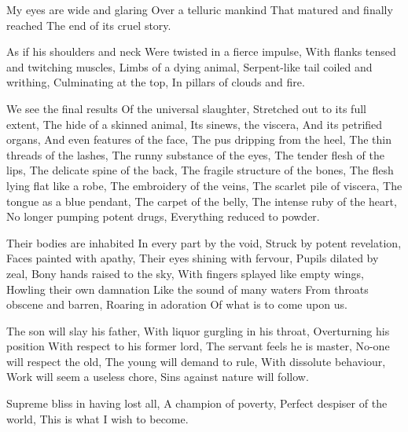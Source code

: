 \documentclass{article}
\newenvironment{stanza}{\begin{minipage}{10cm}\begin{internallinenumbers}\obeylines}{\end{internallinenumbers}\end{minipage}\vspace{\baselineskip}}
\begin{document}
\begin{stanza}
My eyes are wide and glaring
Over a telluric mankind
That matured and finally reached
The end of its cruel story.
\end{stanza}

\begin{stanza}
As if his shoulders and neck
Were twisted in a fierce impulse,
With flanks tensed and twitching muscles,
Limbs of a dying animal,
Serpent-like tail coiled and writhing,
Culminating at the top,
In pillars of clouds and fire.
\end{stanza}

\begin{stanza}
We see the final results
Of the universal slaughter,
Stretched out to its full extent,
The hide of a skinned animal,
Its sinews, the viscera,
And its petrified organs,
And even features of the face,
The pus dripping from the heel,
The thin threads of the lashes,
The runny substance of the eyes,
The tender flesh of the lips,
The delicate spine of the back,
The fragile structure of the bones,
The flesh lying flat like a robe,
The embroidery of the veins,
The scarlet pile of viscera,
The tongue as a blue pendant,
The carpet of the belly,
The intense ruby of the heart,
No longer pumping potent drugs,
Everything reduced to powder.
\end{stanza}

\begin{stanza}
Their bodies are inhabited
In every part by the void,
Struck by potent revelation,
Faces painted with apathy,
Their eyes shining with fervour,
Pupils dilated by zeal,
Bony hands raised to the sky,
With fingers splayed like empty wings,
Howling their own damnation
Like the sound of many waters
From throats obscene and barren,
Roaring in adoration
Of what is to come upon us.
\end{stanza}

\begin{stanza}
The son will slay his father,
With liquor gurgling in his throat,
Overturning his position
With respect to his former lord,
The servant feels he is master,
No-one will respect the old,
The young will demand to rule,
With dissolute behaviour,
Work will seem a useless chore,
Sins against nature will follow.
\end{stanza}

\begin{stanza}
Supreme bliss in having lost all,
A champion of poverty,
Perfect despiser of the world,
This is what I wish to become.
\end{stanza}
\end{document}
